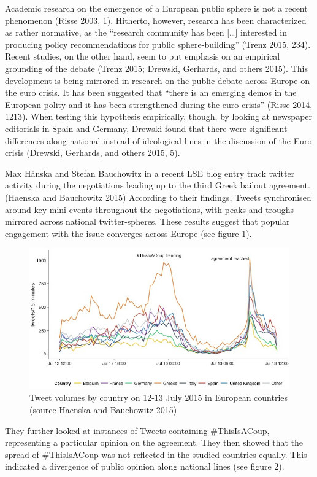 \documentclass[]{article}
\begin{document}
Academic research on the emergence of a European public sphere is not a
recent phenomenon (Risse 2003, 1). Hitherto, however, research has been
characterized as rather normative, as the ``research community has been
{[}\ldots{}{]} interested in producing policy recommendations for public
sphere-building'' (Trenz 2015, 234). Recent studies, on the other hand,
seem to put emphasis on an empirical grounding of the debate (Trenz
2015; Drewski, Gerhards, and others 2015). This development is being
mirrored in research on the public debate across Europe on the euro
crisis. It has been suggested that ``there is an emerging demos in the
European polity and it has been strengthened during the euro crisis''
(Risse 2014, 1213). When testing this hypothesis empirically, though, by
looking at newspaper editorials in Spain and Germany, Drewski found that
there were significant differences along national instead of ideological
lines in the discussion of the Euro crisis (Drewski, Gerhards, and
others 2015, 5).

Max Hänska and Stefan Bauchowitz in a recent LSE blog entry track
twitter activity during the negotiations leading up to the third Greek
bailout agreement. (Haenska and Bauchowitz 2015) According to their
findings, Tweets synchronised around key mini-events throughout the
negotiations, with peaks and troughs mirrored across national
twitter-spheres. These results suggest that popular engagement with the
issue converges across Europe (see figure 1).

\begin{figure}[htbp]
\centering
\includegraphics{../../img/Greece-twitter-1.jpg}
\caption{Tweet volumes by country on 12-13 July 2015 in European
countries (source Haenska and Bauchowitz 2015)}
\end{figure}

They further looked at instances of Tweets containing \#ThisIsACoup,
representing a particular opinion on the agreement. They then showed
that the spread of \#ThisIsACoup was not reflected in the studied
countries equally. This indicated a divergence of public opinion along
national lines (see figure 2).
\end{document}

